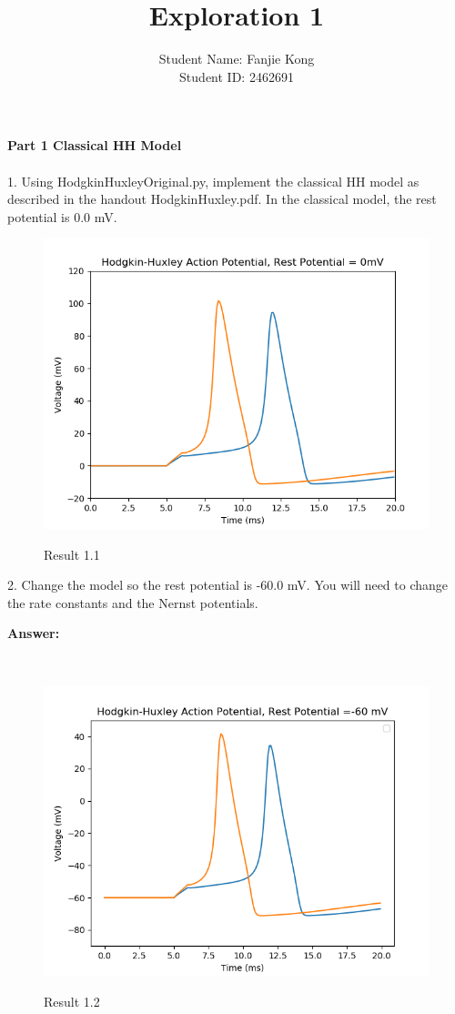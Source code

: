 \documentclass[12pt]{article}
\title{Exploration 1}
\author{Student Name: Fanjie Kong
\\
Student ID: 2462691 }
\begin{document}
\maketitle
\newpage
\textbf{Part 1 Classical HH	Model}
\\\\

1. Using	HodgkinHuxleyOriginal.py,	implement	the	classical	HH	model	as
described	in	the	handout	HodgkinHuxley.pdf.	In	the classical	model,	the	rest
potential	is	0.0	mV.
\\
 \begin{figure}[H]
  \centering
  \includegraphics[width=.8\textwidth]{h1_p1.png} %
  \label{img} %
  \caption{Result 1.1}
\end{figure}
\newpage

2. Change	the	model	so	the	rest	potential	is	-60.0	mV.	You	will	need	to	change	
the rate	constants	and	the	Nernst	potentials.	

\textbf{Answer:} 

\qquad
\\
 \begin{figure}[H]
  \centering
  \includegraphics[width=.8\textwidth]{h1_p2.png} %
  \label{img} %
  \caption{Result 1.2}
\end{figure}
\newpage
\end{document}
